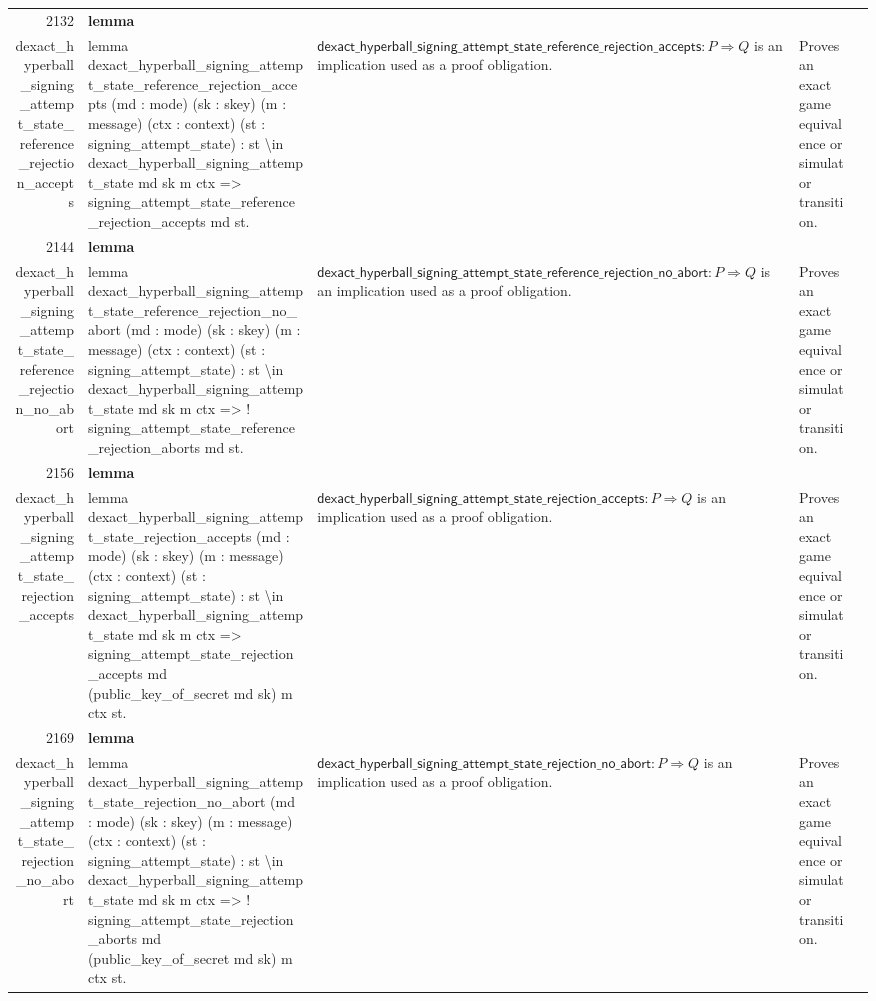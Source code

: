 \documentclass[10pt]{article}
\newcommand{\ec}[1]{\begingroup\ttfamily\scriptsize #1\endgroup}
\begin{document}
\begin{longtable}{r L{0.17\textwidth} L{0.26\textwidth} L{0.27\textwidth} L{0.20\textwidth}}
2132 & \textbf{lemma}\\\ec{dexact\_hyperball\_signing\_attempt\_state\_reference\_rejection\_accepts} & \ec{lemma dexact\_hyperball\_signing\_attempt\_state\_reference\_rejection\_accepts (md : mode) (sk : skey) (m : message) (ctx : context) (st : signing\_attempt\_state) : st \textbackslash{}in dexact\_hyperball\_signing\_attempt\_state md sk m ctx => signing\_attempt\_state\_reference\_rejection\_accepts md st.} & \(\mathsf{dexact\_hyperball\_signing\_attempt\_state\_reference\_rejection\_accepts} : P \Rightarrow Q\) is an implication used as a proof obligation. & Proves an exact game equivalence or simulator transition. \\
2144 & \textbf{lemma}\\\ec{dexact\_hyperball\_signing\_attempt\_state\_reference\_rejection\_no\_abort} & \ec{lemma dexact\_hyperball\_signing\_attempt\_state\_reference\_rejection\_no\_abort (md : mode) (sk : skey) (m : message) (ctx : context) (st : signing\_attempt\_state) : st \textbackslash{}in dexact\_hyperball\_signing\_attempt\_state md sk m ctx => ! signing\_attempt\_state\_reference\_rejection\_aborts md st.} & \(\mathsf{dexact\_hyperball\_signing\_attempt\_state\_reference\_rejection\_no\_abort} : P \Rightarrow Q\) is an implication used as a proof obligation. & Proves an exact game equivalence or simulator transition. \\
2156 & \textbf{lemma}\\\ec{dexact\_hyperball\_signing\_attempt\_state\_rejection\_accepts} & \ec{lemma dexact\_hyperball\_signing\_attempt\_state\_rejection\_accepts (md : mode) (sk : skey) (m : message) (ctx : context) (st : signing\_attempt\_state) : st \textbackslash{}in dexact\_hyperball\_signing\_attempt\_state md sk m ctx => signing\_attempt\_state\_rejection\_accepts md (public\_key\_of\_secret md sk) m ctx st.} & \(\mathsf{dexact\_hyperball\_signing\_attempt\_state\_rejection\_accepts} : P \Rightarrow Q\) is an implication used as a proof obligation. & Proves an exact game equivalence or simulator transition. \\
2169 & \textbf{lemma}\\\ec{dexact\_hyperball\_signing\_attempt\_state\_rejection\_no\_abort} & \ec{lemma dexact\_hyperball\_signing\_attempt\_state\_rejection\_no\_abort (md : mode) (sk : skey) (m : message) (ctx : context) (st : signing\_attempt\_state) : st \textbackslash{}in dexact\_hyperball\_signing\_attempt\_state md sk m ctx => ! signing\_attempt\_state\_rejection\_aborts md (public\_key\_of\_secret md sk) m ctx st.} & \(\mathsf{dexact\_hyperball\_signing\_attempt\_state\_rejection\_no\_abort} : P \Rightarrow Q\) is an implication used as a proof obligation. & Proves an exact game equivalence or simulator transition. \\

\end{longtable}
\end{document}
